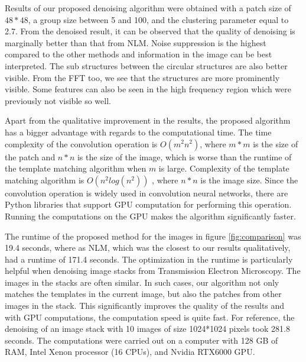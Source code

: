\documentclass[fleqn,10pt]{wlscirep}
\begin{document}
	Results of our proposed denoising algorithm were obtained with a patch size of $48*48$, a group size between 5 and 100, and the clustering parameter equal to 2.7. From the denoised result, it can be observed that the quality of denoising is marginally better than that from NLM. Noise suppression is the highest compared to the other methods and information in the image can be best interpreted. The sub structures between the circular structures are also better visible. From the FFT too, we see that the structures are more prominently visible. Some features can also be seen in the high frequency region which were previously not visible so well.

	
	Apart from the qualitative improvement in the results, the proposed algorithm has a bigger advantage with regards to the computational time. The time complexity of the convolution operation is $O(m^2n^2)$, where $m*m$ is the size of the patch and $n*n$ is the size of the image, which is worse than the runtime of the template matching algorithm when $m$ is large. Complexity of the template matching algorithm is $O(n^2log(n^2))$ \cite{template_matching}, where $n*n$ is the image size. Since the convolution operation is widely used in convolution neural networks, there are Python libraries that support GPU computation for performing this operation. Running the computations on the GPU makes the algorithm significantly faster.
	
	The runtime of the proposed method for the images in figure \ref{fig:comparison} was 19.4 seconds, where as NLM, which was the closest to our results qualitatively, had a runtime of 171.4 seconds. The optimization in the runtime is particularly helpful when denoising image stacks from Transmission Electron Microscopy. The images in the stacks are often similar. In such cases, our algorithm not only matches the templates in the current image, but also the patches from other images in the stack. This significantly improves the quality of the results and with GPU computations, the computation speed is quite fast. For reference, the denoising of an image stack with 10 images of size 1024*1024 pixels took 281.8 seconds. The computations were carried out on a computer with 128 GB of RAM, Intel Xenon processor (16 CPUs), and Nvidia RTX6000 GPU. 
	
	

	
\end{document}
